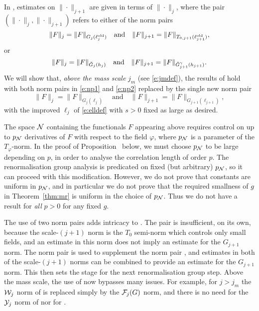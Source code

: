 In \cite{BS-rg-IE}, estimates on $\|\cdot\|_{j+1}$ are given in terms of
$\|\cdot\|_j$, where the pair $(\|\cdot\|_j, \|\cdot\|_{j+1})$ refers to
either of the norm pairs
\begin{equation}
\label{e:np1}
    \|F\|_j = \|F\|_{G_j(\ell_j^{\mathrm{old}})}
    \quad \text{and} \quad
    \|F\|_{j+1} = \|F\|_{T_{0,j+1}(\ell_{j+1}^{\mathrm{old}})},
\end{equation}
or
\begin{equation}
\label{e:np2}
    \|F\|_j = \|F\|_{\tilde{G}_j(h_j)}
    \quad \text{and} \quad
    \|F\|_{j+1} = \|F\|_{\tilde{G}_{j+1}^{\gamma}(h_{j+1})}.
\end{equation}
We will show that, \emph{above the mass scale} $j_m$ (see \eqref{e:jmdef}), the results of \cite{BS-rg-IE} hold  with
both norm pairs in \eqref{e:np1} and \eqref{e:np2} replaced by the single new norm pair
\begin{equation}
\label{e:npmass}
    \|F\|_j = \|F\|_{G_j(\ell_j)}
    \quad \text{and} \quad
    \|F\|_{j+1} = \|F\|_{G_{j+1}(\ell_{j+1})},
\end{equation}
with the improved $\ell_j$ of \eqref{e:elldef} with $s>0$ fixed as large as desired.

The space $\mathcal{N}$ containing the functionals $F$ appearing above requires control on
up to $p_{\mathcal{N}}$ derivatives of $F$ with respect to the field $\varphi$,
where $p_{\mathcal{N}}$ is a parameter of the $T_\varphi$-norm.
In the proof of Proposition~\REF %
below, we must choose $p_{\mathcal{N}}$ to be large depending on $p$,
in order to analyse the correlation length
of order $p$.  The renormalisation group analysis is predicated on fixed (but arbitrary)
$p_{\mathcal{N}}$, so it can proceed with this modification.  However,
we do not prove that constants are uniform in $p_{\mathcal{N}}$,
and in particular we do not prove that the required smallness of $g$ in
Theorem~\ref{thm:mr} is uniform in the choice of $p_{\mathcal{N}}$.
Thus we do not have a result for \emph{all} $p>0$ for any fixed $g$.


The use of two norm pairs adds intricacy to \cite{BS-rg-IE,BS-rg-step}.
The pair  is insufficient, on its own, because the scale-$(j+1)$ norm
is the $T_0$ semi-norm which controls only small fields, and an estimate in this norm
does not imply an estimate for the $G_{j+1}$ norm.  The norm pair  is
used to supplement the norm pair , and estimates in both of the scale-$(j+1)$
norms can be combined to provide an estimate for the $G_{j+1}$ norm.  This then
sets the stage for the next renormalisation group step.  Above the mass scale,
the use of  now bypasses many issues.  For example, for $j>j_m$
 the $\mathcal{W}_j$ norm of \cite[\eqref{step-e:9Kcalnorm}]{BS-rg-step} is replaced
 simply by the $\mathcal{F}_j(G)$ norm, and there is no need for the $\mathcal{Y}_j$ norm of
\cite[\eqref{step-e:Ycaldef}]{BS-rg-step} nor for \cite[Lemma~\ref{step-lem:KKK}]{BS-rg-step}.

